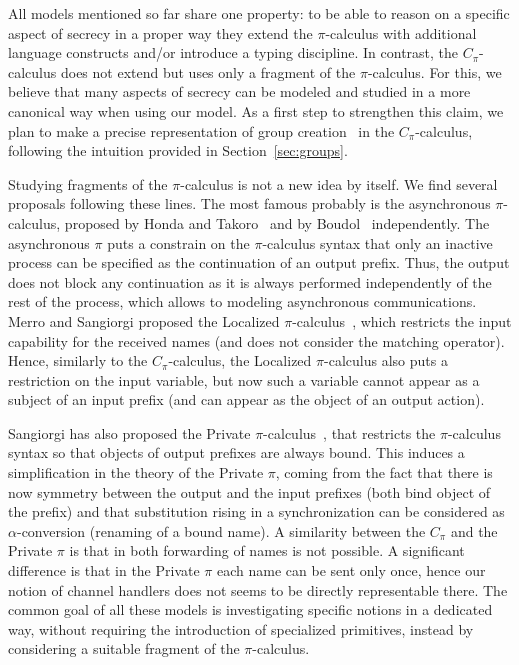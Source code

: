All models mentioned so far share one property: to be able to reason on a specific aspect of secrecy in a proper way they extend the $\pi$-calculus with 
additional language constructs and/or introduce a typing discipline.
In contrast, the $C_\pi$-calculus does not extend but uses only a fragment of the $\pi$-calculus. 
For this,  
we believe that %
many aspects of secrecy can be modeled and studied in a more canonical way when using our model. 
As a first step to strengthen this claim, we plan to make a precise representation of group creation~\cite{cardelli05} in the 
$C_\pi$-calculus, following the intuition provided in Section~\ref{sec:groups}.

Studying fragments of the $\pi$-calculus is not a new idea by itself. We find several proposals following these lines.
The most famous probably is the asynchronous $\pi$-calculus, proposed by Honda and Takoro~\cite{DBLP:conf/ecoop/HondaT91} and by Boudol~\cite{boudol:inria-00076939} independently. The asynchronous $\pi$ puts a 
constrain on the $\pi$-calculus syntax that only an inactive process can be specified as the continuation of an output 
prefix. Thus, the output does not block any continuation as it is always performed independently of the rest of the process, which allows to  modeling asynchronous communications. 
Merro and Sangiorgi proposed the Localized $\pi$-calculus~\cite{merro04}, which 
restricts the input capability for the received names (and does not consider the matching operator). Hence, similarly to the $C_\pi$-calculus, the Localized $\pi$-calculus also puts a restriction on the input variable, but now such a variable cannot appear as a subject of an input prefix (and can appear as  the object of an output action).

Sangiorgi has also proposed the Private $\pi$-calculus~\cite{DBLP:journals/tcs/Sangiorgi96a}, that  
restricts the $\pi$-calculus syntax so that objects of output prefixes are always bound. This induces a simplification in the theory of the Private $\pi$, coming from the fact that there is now symmetry between the output and the input prefixes (both bind object of the prefix) and that substitution rising in a synchronization can be considered as $\alpha$-conversion (renaming of a bound name). 
A similarity between the $C_\pi$ and the Private $\pi$ is that in both forwarding of names is not possible. A significant difference is that in the Private $\pi$ each name can be sent only once, hence our notion of channel handlers does not seems to be directly representable there.
The common goal of all these models is investigating specific notions in a dedicated way, without requiring the introduction of specialized primitives, instead by considering a suitable fragment of the $\pi$-calculus.

